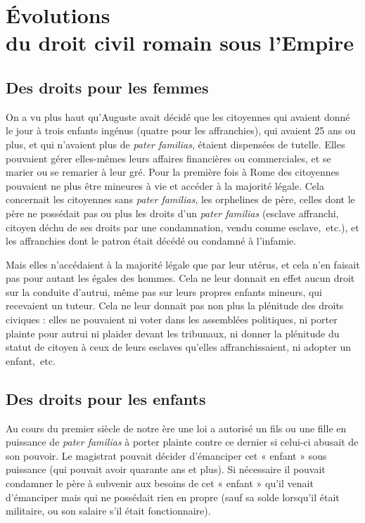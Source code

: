 


\chapter[Évolutions du droit civil romain sous l'Empire]{Évolutions\\du droit civil romain sous l'Empire}


\section{Des droits pour les femmes}

 On a vu plus haut qu'Auguste avait décidé que les citoyennes qui avaient donné le jour à trois enfants ingénus (quatre pour les affranchies), qui avaient 25 ans ou plus, et qui n'avaient plus de \emph{pater familias}, étaient dispensées de tutelle. Elles pouvaient gérer elles-mêmes leurs affaires financières ou commerciales, et se marier ou se remarier à leur gré. Pour la première fois à Rome des citoyennes pouvaient ne plus être mineures à vie et accéder à la majorité légale. Cela concernait les citoyennes sans \emph{pater familias}, les orphelines de père, celles dont le père ne possédait pas ou plus les droits d'un \emph{pater familias} (esclave affranchi, citoyen déchu de ses droits par une condamnation, vendu comme esclave,~etc.), et les affranchies dont le patron était décédé ou condamné à l'infamie. 

 Mais elles n'accédaient à la majorité légale que par leur utérus, et cela n'en faisait pas pour autant les égales des hommes. Cela ne leur donnait en effet aucun droit sur la conduite d'autrui, même pas sur leurs propres enfants mineurs, qui recevaient un tuteur. Cela ne leur donnait pas non plus la plénitude des droits civiques : elles ne pouvaient ni voter dans les assemblées politiques, ni porter plainte pour autrui ni plaider devant les tribunaux, ni donner la plénitude du statut de citoyen à ceux de leurs esclaves qu'elles affranchissaient, ni adopter un enfant,~etc.
 
 
\section{Des droits pour les enfants}

 Au cours du premier siècle de notre ère une loi a autorisé un fils ou une fille en puissance de \emph{pater familias} à porter plainte contre ce dernier si celui-ci abusait de son pouvoir. Le magistrat pouvait décider d'émanciper cet « enfant » sous puissance (qui pouvait avoir quarante ans et plus). Si nécessaire il pouvait condamner le père à subvenir aux besoins de cet « enfant » qu'il venait d'émanciper mais qui ne possédait rien en propre (sauf sa solde lorsqu'il était militaire, ou son salaire s'il était fonctionnaire). 
 
